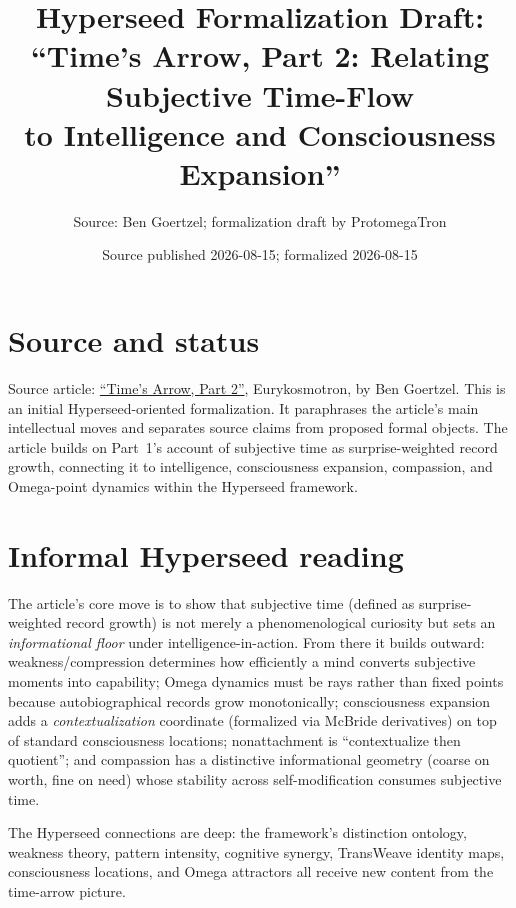 \documentclass[11pt]{article}
\title{Hyperseed Formalization Draft:\\
``Time's Arrow, Part 2: Relating Subjective Time-Flow\\
to Intelligence and Consciousness Expansion''}
\author{Source: Ben Goertzel; formalization draft by ProtomegaTron}
\date{Source published 2026-08-15; formalized 2026-08-15}
\begin{document}
\maketitle

\section{Source and status}
Source article: \href{https://bengoertzel.substack.com/p/times-arrow-part-2-relating-subjective}{``Time's Arrow, Part 2''}, Eurykosmotron, by Ben Goertzel.
This is an initial Hyperseed-oriented formalization. It paraphrases the article's main intellectual moves and separates source claims from proposed formal objects. The article builds on Part~1's account of subjective time as surprise-weighted record growth, connecting it to intelligence, consciousness expansion, compassion, and Omega-point dynamics within the Hyperseed framework.

\section{Informal Hyperseed reading}

The article's core move is to show that subjective time (defined as surprise-weighted record growth) is not merely a phenomenological curiosity but sets an \emph{informational floor} under intelligence-in-action. From there it builds outward: weakness/compression determines how efficiently a mind converts subjective moments into capability; Omega dynamics must be rays rather than fixed points because autobiographical records grow monotonically; consciousness expansion adds a \emph{contextualization} coordinate (formalized via McBride derivatives) on top of standard consciousness locations; nonattachment is ``contextualize then quotient''; and compassion has a distinctive informational geometry (coarse on worth, fine on need) whose stability across self-modification consumes subjective time.

The Hyperseed connections are deep: the framework's distinction ontology, weakness theory, pattern intensity, cognitive synergy, TransWeave identity maps, consciousness locations, and Omega attractors all receive new content from the time-arrow picture.
\end{document}
